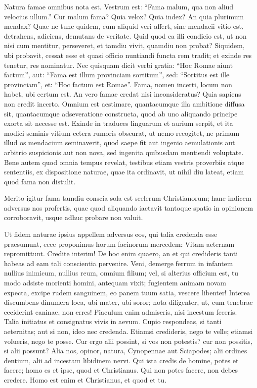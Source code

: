Natura famae omnibus nota est. Vestrum est: ``Fama malum, qua non aliud velocius ullum.'' Cur malum fama? Quia velox? Quia index? An quia plurimum mendax? Quae ne tunc quidem, cum aliquid veri affert, sine mendacii vitio est, detrahens, adiciens, demutans de veritate. Quid quod ea illi condicio est, ut non nisi cum mentitur, perseveret, et tamdiu vivit, quamdiu non probat? Siquidem, ubi probavit, cessat esse et quasi officio nuntiandi functa rem tradit; et exinde res tenetur, res nominatur. Nec quisquam dicit verbi gratia: ``Hoc Romae aiunt factum'', aut: ``Fama est illum provinciam sortitum'', sed: ``Sortitus est ille provinciam'', et: ``Hoc factum est Romae''. Fama, nomen incerti, locum non habet, ubi certum est. An vero famae credat nisi inconsideratus? Quia sapiens non credit incerto. Omnium est aestimare, quantacumque illa ambitione diffusa sit, quantacumque adseveratione constructa, quod ab uno aliquando principe exorta sit necesse est. Exinde in traduces linguarum et aurium serpit, et ita modici seminis vitium cetera rumoris obscurat, ut nemo recogitet, ne primum illud os mendacium seminaverit, quod saepe fit aut ingenio aemulationis aut arbitrio suspicionis aut non nova, sed ingenita quibusdam mentiendi voluptate. Bene autem quod omnia tempus revelat, testibus etiam vestris proverbiis atque sententiis, ex dispositione naturae, quae ita ordinavit, ut nihil diu lateat, etiam quod fama non distulit.

Merito igitur fama tamdiu conscia sola est scelerum Christianorum; hanc indicem adversus nos profertis, quae quod aliquando iactavit tantoque spatio in opinionem corroboravit, usque adhuc probare non valuit.

Ut fidem naturae ipsius appellem adversus eos, qui talia credenda esse praesumunt, ecce proponimus horum facinorum mercedem: Vitam aeternam repromittunt. Credite interim! De hoc enim quaero, an et qui credideris tanti habeas ad eam tali conscientia pervenire. Veni, demerge ferrum in infantem nullius inimicum, nullius reum, omnium filium; vel, si alterius officium est, tu modo adsiste morienti homini, antequam vixit; fugientem animam novam expecta, excipe rudem sanguinem, eo panem tuum satia, vescere libenter! Interea discumbens dinumera loca, ubi mater, ubi soror; nota diligenter, ut, cum tenebrae ceciderint caninae, non erres! Piaculum enim admiseris, nisi incestum feceris. Talia initiatus et consignatus vivis in aevum. Cupio respondeas, si tanti aeternitas; aut si non, ideo nec credenda. Etiamsi credideris, nego te velle; etiamsi volueris, nego te posse. Cur ergo alii possint, si vos non potestis? cur non possitis, si alii possunt? Alia nos, opinor, natura, Cynopennae aut Sciapodes; alii ordines dentium, alii ad incestam libidinem nervi. Qui ista credis de homine, potes et facere; homo es et ipse, quod et Christianus. Qui non potes facere, non debes credere. Homo est enim et Christianus, et quod et tu. 

